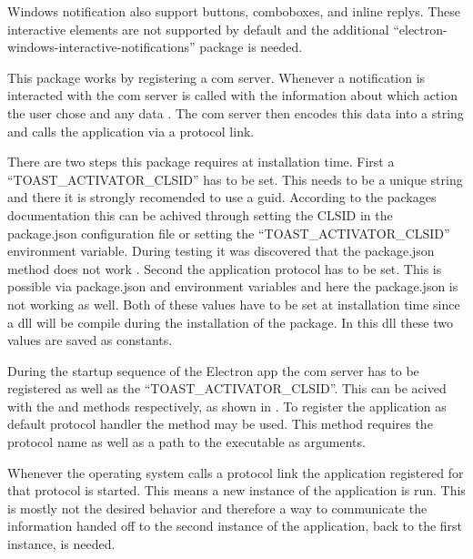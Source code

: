 
Windows notification also support buttons, comboboxes, and inline replys. These interactive elements are not supported by default and the additional \enquote{electron-windows-interactive-notifications} package is needed.

This package works by registering a \gls{com} server. Whenever a notification is interacted with the \gls{com} server is called with the information about which action the user chose and any data . The \gls{com} server then encodes this data into a string and calls the application via a protocol link.

There are two steps this package requires at installation time. First a \enquote{TOAST\_ACTIVATOR\_CLSID} has to be set. This needs to be a unique string and there it is strongly recomended to use a \gls{guid}. According to the packages documentation this can be achived through setting the CLSID in the package.json configuration file or setting the \enquote{TOAST\_ACTIVATOR\_CLSID} environment variable. During testing it was discovered that the package.json method does not work \cite{clsidPackageJson}. Second the application protocol has to be set. This is possible via package.json and environment variables and here the package.json is not working as well. Both of these values have to be set at installation time since a \gls{dll} will be compile during the installation of the package. In this \gls{dll} these two values are saved as constants.

During the startup sequence of the Electron app the \gls{com} server has to be registered as well as the \enquote{TOAST\_ACTIVATOR\_CLSID}. This can be acived with the  and  methods respectively, as shown in . To register the application as default protocol handler the  method may be used. This method requires the protocol name as well as a path to the executable as arguments.


Whenever the operating system calls a protocol link the application registered for that protocol is started. This means a new instance of the application is run. This is mostly not the desired behavior and therefore a way to communicate the information handed off to the second instance of the application, back to the first instance, is needed.

